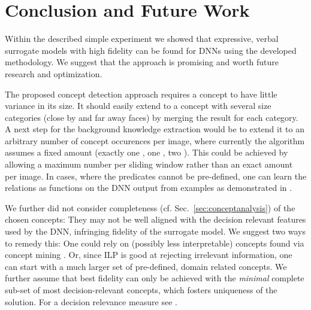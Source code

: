 \section{Conclusion and Future Work}

Within the described simple experiment we showed that expressive,
verbal surrogate models with high fidelity can be found for DNNs using
the developed methodology. We suggest that the approach is promising
and worth future research and optimization.

% 
The proposed concept detection approach requires a concept to have
little variance in its size. It should easily extend to
a concept with several size categories (\forexample close by and far away
faces) by merging the result for each category.
% 
A next step for the background knowledge extraction would be to extend
it to an arbitrary number of concept occurences per image, where
currently the algorithm assumes a fixed amount (exactly one , one
, two ). This could \forexample be achieved by allowing
a maximum number per sliding window rather than an exact amount per image.
% 
In cases, where the predicates cannot be pre-defined, one can learn
the relations as functions on the DNN output from examples as
demonstrated in \cite{donadello_logic_2017}.

We further did not consider completeness
(cf. Sec.~\ref{sec:conceptanalysis}) of the chosen concepts:
They may not be well aligned with the decision relevant features used
by the DNN, infringing fidelity of the surrogate model.
We suggest two ways to remedy this:
One could rely on (possibly less interpretable) concepts found via
concept mining \cite{ghorbani_towards_2019}.
Or, since ILP is good at rejecting irrelevant information, one can
start with a much larger set of pre-defined, domain related concepts.
We further
assume that best fidelity can only be achieved with the \emph{minimal}
complete sub-set of most decision-relevant concepts, which fosters
uniqueness of the solution.
For a decision relevance measure see \forexample
\cite{ghorbani_towards_2019}.

